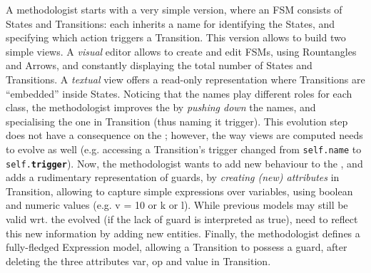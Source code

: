 A methodologist starts with a very simple version, where an \textsf{FSM} consists
of \textsf{State}s and \textsf{Transition}s: each inherits a \textsf{name} for
identifying the \textsf{State}s, and specifying which action triggers a 
\textsf{Transition}. This version allows to build two simple views. A \emph{visual}
editor allows to create and edit \textsf{FSM}s, using \textsf{Rountangle}s and
\textsf{Arrow}s, and constantly displaying the total number of \textsf{State}s
and \textsf{Transition}s. A \emph{textual} view offers a read-only representation
where \textsf{Transition}s are ``embedded'' inside \textsf{State}s. 
%
Noticing that the \textsf{name}s play different roles for each class, the methodologist
improves the \metamodel by \emph{pushing down} the \textsf{name}s, and specialising
the one in \textsf{Transition} (thus naming it \textsf{trigger}). This evolution
step does not have a consequence on the \viewtypes; however, the way views are
computed needs to evolve as well (e.g. accessing a \textsf{Transition}'s trigger
changed from \texttt{self.name} to \texttt{self.\textbf{trigger}}).
%
Now, the methodologist wants to add new behaviour to the \metamodel, and adds
a rudimentary representation of guards, by \emph{creating (new) attributes}
in \textsf{Transition}, allowing to capture simple expressions over 
\textsf{var}iables, using boolean and numeric \textsf{value}s
(e.g. \textsf{v = 10} or \textsf{k or l}). While previous models may still be valid
wrt. the evolved \metamodel (if the lack of guard is interpreted as \textsf{true}),
\viewtypes need to reflect this new information by adding new entities. 
%
Finally, the methodologist defines a fully-fledged \textsf{Expression} model,
allowing a \textsf{Transition} to possess a \textsf{guard}, after deleting the
three attributes \textsf{var}, \textsf{op} and \textsf{value} in \textsf{Transition}.
